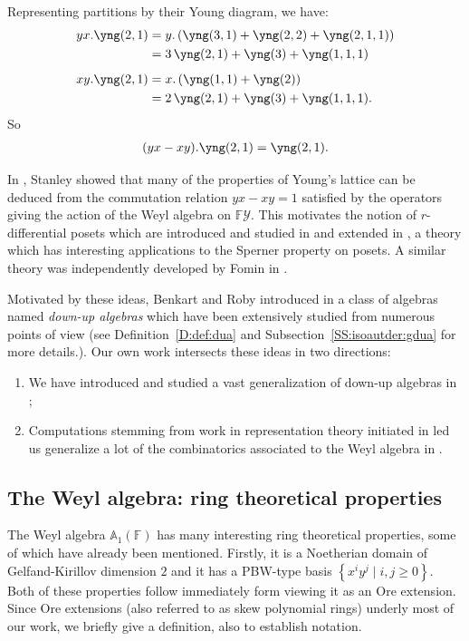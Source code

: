 \documentclass{commat}
\newcommand{\FF}{\mathbb{F}}
\newcommand{\wa}[1][1]{\mathbb{A}_{#1}}
\newcommand{\pb}[1]{\left\{ #1\right\}}
\newcommand{\seq}[1]{\left( #1\right)}
\begin{document}
\begin{example}
	Representing partitions by their Young diagram, we have:
	\begin{align*}
		yx.\yng(2,1)&=y.\seq{\yng(3,1)+\yng(2,2)+\yng(2,1,1)}\\
		&=3\,\yng(2,1)+\yng(3)+\yng(1,1,1)\\[5pt]
		xy.\yng(2,1)&=x.\seq{\yng(1,1)+\yng(2)}\\
		&=2\,\yng(2,1)+\yng(3)+\yng(1,1,1).
	\end{align*}
	So
	\begin{align*}
		(yx-xy).\yng(2,1)=\yng(2,1).
	\end{align*}
\end{example}

In \cite{rS88}, Stanley showed that many of the properties of Young's lattice can be deduced from the commutation relation $yx-xy=1$ satisfied by the operators giving the action of the Weyl algebra on $\FF\mathcal Y$. This motivates the notion of  $r$-differential posets which are introduced and studied in \cite{rS88} and extended in \cite{rS90}, a theory which has interesting applications to the Sperner property on posets. A similar theory was independently developed by Fomin in \cite{sF86, sF94}.

Motivated by these ideas, Benkart and Roby introduced in \cite{BR98} a class of algebras named \textit{down-up algebras} which have been extensively studied from numerous points of view (see Definition~\ref{D:def:dua} and Subsection~\ref{SS:isoautder:gdua} for more details.). Our own work intersects these ideas in two directions:
%
\begin{enumerate}[label=\textup{(\roman*)}]
	\item We have introduced and studied a vast generalization of down-up algebras in \cite{LR22ca, LR22jaa};
	\item Computations stemming from work in representation theory initiated in \cite{BLO13} led us generalize a lot of the combinatorics associated to the Weyl algebra in \cite{BLR20}.
\end{enumerate}






\subsection{The Weyl algebra: ring theoretical properties}\label{SS:intro:wa:ring}

The Weyl algebra $\wa(\FF)$ has many interesting ring theoretical properties, some of which have already been mentioned. Firstly, it is a Noetherian domain of Gelfand-Kirillov dimension $2$ and it has a PBW-type basis $\pb{x^iy^j\mid i, j\geq 0}$. Both of these properties follow immediately form viewing it as an Ore extension. Since Ore extensions (also referred to as skew polynomial rings) underly most of our work, we briefly give a definition, also to establish notation.
\end{document}
